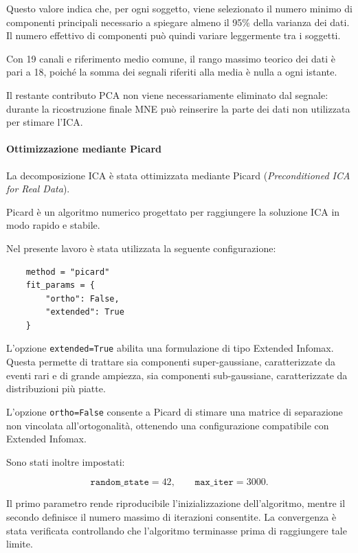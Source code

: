 Questo valore indica che, per ogni soggetto, viene selezionato il
numero minimo di componenti principali necessario a spiegare almeno
il 95\% della varianza dei dati. Il numero effettivo di componenti
può quindi variare leggermente tra i soggetti.

Con 19 canali e riferimento medio comune, il rango massimo teorico
dei dati è pari a 18, poiché la somma dei segnali riferiti alla media
è nulla a ogni istante.

Il restante contributo PCA non viene necessariamente eliminato dal
segnale: durante la ricostruzione finale MNE può reinserire la parte
dei dati non utilizzata per stimare l'ICA.


\paragraph{Ottimizzazione mediante Picard}

La decomposizione ICA è stata ottimizzata mediante Picard
(\textit{Preconditioned ICA for Real Data}).

Picard è un algoritmo numerico progettato per raggiungere la soluzione
ICA in modo rapido e stabile.

Nel presente lavoro è stata utilizzata la seguente configurazione:

\begin{verbatim}
	method = "picard"
	fit_params = {
		"ortho": False,
		"extended": True
	}
\end{verbatim}

L'opzione \texttt{extended=True} abilita una formulazione di tipo
Extended Infomax. Questa permette di trattare sia componenti
super-gaussiane, caratterizzate da eventi rari e di grande ampiezza,
sia componenti sub-gaussiane, caratterizzate da distribuzioni più
piatte.

L'opzione \texttt{ortho=False} consente a Picard di stimare una
matrice di separazione non vincolata all'ortogonalità, ottenendo una
configurazione compatibile con Extended Infomax.

Sono stati inoltre impostati:

\begin{equation}
	\texttt{random\_state}=42,
	\qquad
	\texttt{max\_iter}=3000.
\end{equation}

Il primo parametro rende riproducibile l'inizializzazione
dell'algoritmo, mentre il secondo definisce il numero massimo di
iterazioni consentite. La convergenza è stata verificata controllando
che l'algoritmo terminasse prima di raggiungere tale limite.


